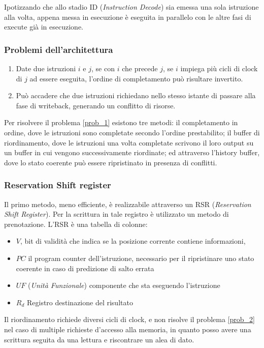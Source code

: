 \documentclass[../template]{subfiles}
\begin{document}
Ipotizzando che allo stadio ID (\textit{Instruction Decode}) sia emessa una sola istruzione alla volta, appena messa in esecuzione è eseguita in parallelo con le altre fasi di execute già in esecuzione.

\subsubsection{Problemi dell'architettura}
\begin{enumerate}
    \item \label{prob_1} Date due istruzioni $i$ e $j$, se con $i$ che precede $j$, se $i$ impiega più cicli di clock di $j$ ad essere eseguita,
        l'ordine di completamento può risultare invertito.
    \item \label{prob_2} Può accadere che due istruzioni richiedano nello stesso istante di passare alla fase di writeback, generando un conflitto di risorse.
\end{enumerate}

Per risolvere il problema \ref{prob_1} esistono tre metodi: il completamento in ordine, dove le istruzioni sono
completate secondo l'ordine prestabilito; il buffer di riordinamento, dove le istruzioni una volta completate scrivono il
loro output su un buffer in cui vengono successivamente riordinate; ed attraverso l'history buffer, dove lo stato
coerente può essere ripristinato in presenza di conflitti.

\subsubsection{Reservation Shift register}
Il primo metodo, meno efficiente, è realizzabile attraverso un RSR (\textit{Reservation Shift Register}). Per la
scrittura in tale registro è utilizzato un metodo di prenotazione.
L'RSR è una tabella di colonne:
\begin{itemize}
    \item $V$, bit di validità che indica se la posizione corrente contiene informazioni,
    \item $PC$ il program counter dell'istruzione, necessario per il ripristinare uno stato coerente in caso di
        predizione di salto errata
    \item $UF$ (\textit{Unità Funzionale}) componente che sta eseguendo l'istruzione
    \item $R_d$ Registro destinazione del risultato
\end{itemize}
Il riordinamento richiede diversi cicli di clock, e non risolve il problema \ref{prob_2} nel caso di multiple richieste d'accesso alla memoria,
in quanto posso avere una scrittura seguita da una lettura e riscontrare un alea di dato.
\end{document}
